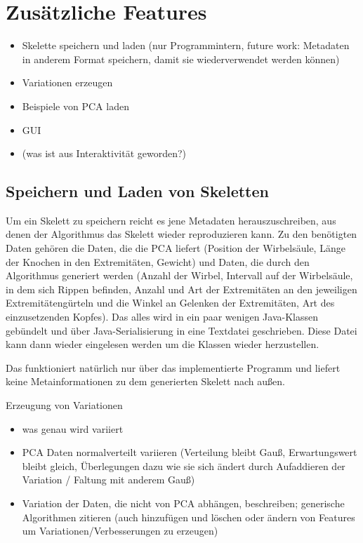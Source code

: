 \chapter{Zusätzliche Features}

\begin{itemize}
 \item Skelette speichern und laden (nur Programmintern, future work: Metadaten in anderem Format speichern, damit sie wiederverwendet werden können)
 \item Variationen erzeugen
 \item Beispiele von PCA laden
 \item GUI
 \item (was ist aus Interaktivität geworden?)
\end{itemize}


\section{Speichern und Laden von Skeletten}

Um ein Skelett zu speichern reicht es jene Metadaten herauszuschreiben, aus denen der Algorithmus das Skelett wieder reproduzieren kann. Zu den benötigten Daten gehören die Daten, die die PCA liefert (Position der Wirbelsäule, Länge der Knochen in den Extremitäten, Gewicht) und Daten, die durch den Algorithmus generiert werden (Anzahl der Wirbel, Intervall auf der Wirbelsäule, in dem sich Rippen befinden, Anzahl und Art der Extremitäten an den jeweiligen Extremitätengürteln und die Winkel an Gelenken der Extremitäten, Art des einzusetzenden Kopfes).
Das alles wird in ein paar wenigen Java-Klassen gebündelt und über Java-Serialisierung in eine Textdatei geschrieben. Diese Datei kann dann wieder eingelesen werden um die Klassen wieder herzustellen.

Das funktioniert natürlich nur über das implementierte Programm und liefert keine Metainformationen zu dem generierten Skelett nach außen.


Erzeugung von Variationen 
\begin{itemize}
 \item was genau wird variiert
 \item PCA Daten normalverteilt variieren (Verteilung bleibt Gauß, Erwartungswert bleibt gleich, Überlegungen dazu wie sie sich ändert durch Aufaddieren der Variation / Faltung mit anderem Gauß)
 \item Variation der Daten, die nicht von PCA abhängen, beschreiben; generische Algorithmen zitieren (auch hinzufügen und löschen oder ändern von Features um Variationen/Verbesserungen zu erzeugen)
\end{itemize}
